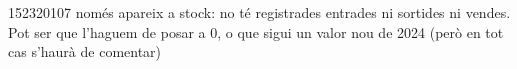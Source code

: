 152320107 només apareix a stock: no té registrades entrades ni sortides ni vendes. Pot ser que l'haguem de posar a 0, o que sigui un valor nou de 2024 (però en tot cas s'haurà de comentar) 